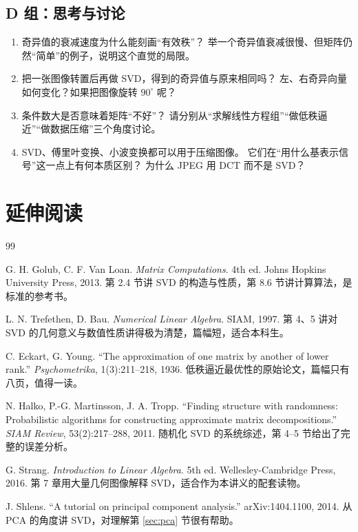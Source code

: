 \documentclass[UTF8, 11pt, a4paper, fontset=windows]{ctexart}
\theoremstyle{cnthm}
\theoremstyle{cndef}
\begin{document}
\subsection*{D 组：思考与讨论}

\begin{enumerate}[label=\textbf{D\arabic*.}, leftmargin=3.0em, itemsep=0.6em]
  \item 奇异值的衰减速度为什么能刻画“有效秩”？
        举一个奇异值衰减很慢、但矩阵仍然“简单”的例子，说明这个直觉的局限。

  \item 把一张图像转置后再做 SVD，得到的奇异值与原来相同吗？
        左、右奇异向量如何变化？如果把图像旋转 $90^\circ$ 呢？

  \item 条件数大是否意味着矩阵“不好”？
        请分别从“求解线性方程组”“做低秩逼近”“做数据压缩”三个角度讨论。

  \item SVD、傅里叶变换、小波变换都可以用于压缩图像。
        它们在“用什么基表示信号”这一点上有何本质区别？
        为什么 JPEG 用 DCT 而不是 SVD？
\end{enumerate}

\section*{延伸阅读}

\renewcommand{\refname}{}
\begin{thebibliography}{99}
\small
\setlength{\itemsep}{0.35em}

 G. H. Golub, C. F. Van Loan.
\textit{Matrix Computations}. 4th ed. Johns Hopkins University Press, 2013.
\quad 第 2.4 节讲 SVD 的构造与性质，第 8.6 节讲计算算法，是标准的参考书。

 L. N. Trefethen, D. Bau.
\textit{Numerical Linear Algebra}. SIAM, 1997.
\quad 第 4、5 讲对 SVD 的几何意义与数值性质讲得极为清楚，篇幅短，适合本科生。

 C. Eckart, G. Young.
“The approximation of one matrix by another of lower rank.”
\textit{Psychometrika}, 1(3):211--218, 1936.
\quad 低秩逼近最优性的原始论文，篇幅只有八页，值得一读。

 N. Halko, P.-G. Martinsson, J. A. Tropp.
“Finding structure with randomness: Probabilistic algorithms for constructing
approximate matrix decompositions.”
\textit{SIAM Review}, 53(2):217--288, 2011.
\quad 随机化 SVD 的系统综述，第 4--5 节给出了完整的误差分析。

 G. Strang.
\textit{Introduction to Linear Algebra}. 5th ed. Wellesley-Cambridge Press, 2016.
\quad 第 7 章用大量几何图像解释 SVD，适合作为本讲义的配套读物。

 J. Shlens.
“A tutorial on principal component analysis.”
arXiv:1404.1100, 2014.
\quad 从 PCA 的角度讲 SVD，对理解第 \ref{sec:pca} 节很有帮助。

\end{thebibliography}

\vspace{1.2em}
\noindent{\color{navy!30}\rule{\linewidth}{0.5pt}}
\vspace{0.5em}
\end{document}
